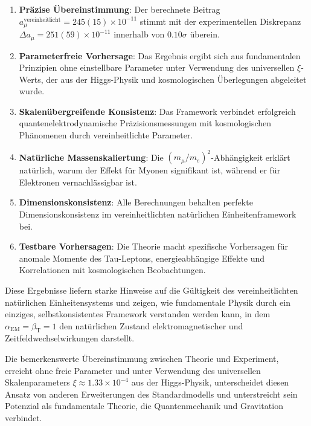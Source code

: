 \documentclass[12pt,a4paper]{article}
\newcommand{\alphaEM}{\alpha_{\text{EM}}}
\newcommand{\betaT}{\beta_{\text{T}}}
\newcommand{\xipar}{\xi}
\begin{document}
	\begin{enumerate}
		\item \textbf{Präzise Übereinstimmung}: Der berechnete Beitrag $a_\mu^{\text{vereinheitlicht}} = 245(15) \times 10^{-11}$ stimmt mit der experimentellen Diskrepanz $\Delta a_\mu = 251(59) \times 10^{-11}$ innerhalb von $0.10\sigma$ überein.
		
		\item \textbf{Parameterfreie Vorhersage}: Das Ergebnis ergibt sich aus fundamentalen Prinzipien ohne einstellbare Parameter unter Verwendung des universellen $\xipar$-Werts, der aus der Higgs-Physik und kosmologischen Überlegungen abgeleitet wurde.
		
		\item \textbf{Skalenübergreifende Konsistenz}: Das Framework verbindet erfolgreich quantenelektrodynamische Präzisionsmessungen mit kosmologischen Phänomenen durch vereinheitlichte Parameter.
		
		\item \textbf{Natürliche Massenskaliertung}: Die $(m_\mu/m_e)^2$-Abhängigkeit erklärt natürlich, warum der Effekt für Myonen signifikant ist, während er für Elektronen vernachlässigbar ist.
		
		\item \textbf{Dimensionskonsistenz}: Alle Berechnungen behalten perfekte Dimensionskonsistenz im vereinheitlichten natürlichen Einheitenframework bei.
		
		\item \textbf{Testbare Vorhersagen}: Die Theorie macht spezifische Vorhersagen für anomale Momente des Tau-Leptons, energieabhängige Effekte und Korrelationen mit kosmologischen Beobachtungen.
	\end{enumerate}
	
	Diese Ergebnisse liefern starke Hinweise auf die Gültigkeit des vereinheitlichten natürlichen Einheitensystems und zeigen, wie fundamentale Physik durch ein einziges, selbstkonsistentes Framework verstanden werden kann, in dem $\alphaEM = \betaT = 1$ den natürlichen Zustand elektromagnetischer und Zeitfeldwechselwirkungen darstellt.
	
	Die bemerkenswerte Übereinstimmung zwischen Theorie und Experiment, erreicht ohne freie Parameter und unter Verwendung des universellen Skalenparameters $\xipar \approx 1.33 \times 10^{-4}$ aus der Higgs-Physik, unterscheidet diesen Ansatz von anderen Erweiterungen des Standardmodells und unterstreicht sein Potenzial als fundamentale Theorie, die Quantenmechanik und Gravitation verbindet.
	
\end{document}
